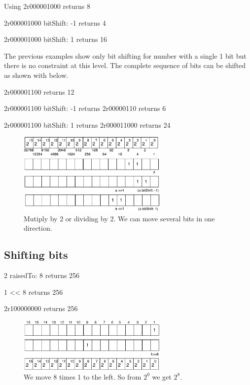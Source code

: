 \documentclass[a4paper,10pt,twoside]{book}
\begin{document}
\begin{code}{Using }
2r000001000 
	returns 8

2r000001000 bitShift: -1
	returns 4
	
2r000001000 bitShift: 1
	returns 16
\end{code}

The previous examples show only bit shifting for number with a single 1 bit but there is no constraint at this level.
The complete sequence of bits can be shifted as shown with  below.


\begin{code}{}
2r000001100 
	returns 12

2r000001100 bitShift: -1
	returns 2r00000110
	returns 6 
	
2r000001100 bitShift: 1
	returns 2r000011000
	returns 24
\end{code}

\begin{figure}[h]
\begin{center}
\includegraphics[width=0.65\textwidth]{16bits-numberMultiplication2}
\caption{Mutiply by 2 or dividing by 2. We can move several bits in one direction.}
\end{center}
\end{figure}

\subsection*{Shifting bits}


\begin{code}{}
2 raisedTo: 8
	returns 256
	
1 << 8
	returns 256
	
2r100000000
	returns 256
		
\end{code}

\begin{figure}[h]
\begin{center}
\includegraphics[width=0.65\textwidth]{16bits-1shifted8}
\caption{We move 8 times 1 to the left. So from $2^{0}$ we get $2^{8}$.}
\end{center}
\end{figure}
\end{document}
